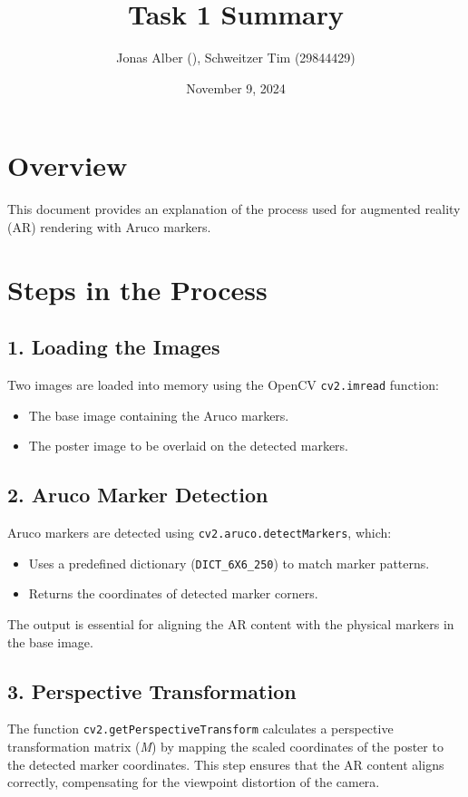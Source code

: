 \documentclass{article}
\begin{document}
\title{Task 1 Summary}
\author{Jonas Alber (), Schweitzer Tim (29844429)}
\date{November 9, 2024}

\maketitle 

\section*{Overview}
This document provides an explanation of the process used for augmented reality (AR) rendering with Aruco markers.

\section*{Steps in the Process}
\subsection*{1. Loading the Images}
Two images are loaded into memory using the OpenCV \texttt{cv2.imread} function:
\begin{itemize}
    \item The base image containing the Aruco markers.
    \item The poster image to be overlaid on the detected markers.
\end{itemize}

\subsection*{2. Aruco Marker Detection}
Aruco markers are detected using \texttt{cv2.aruco.detectMarkers}, which:
\begin{itemize}
    \item Uses a predefined dictionary (\texttt{DICT\_6X6\_250}) to match marker patterns.
    \item Returns the coordinates of detected marker corners.
\end{itemize}
The output is essential for aligning the AR content with the physical markers in the base image.

\subsection*{3. Perspective Transformation}
The function \texttt{cv2.getPerspectiveTransform} calculates a perspective transformation matrix (\textit{M}) by mapping the scaled coordinates of the poster to the detected marker coordinates. This step ensures that the AR content aligns correctly, compensating for the viewpoint distortion of the camera.
\end{document}

